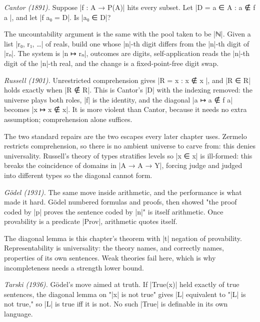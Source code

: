 \documentclass{memoir}
\begin{document}
\emph{Cantor (1891).} Suppose \LeanVerb|f : A → P(A)| hits every subset. Let \LeanVerb|D =  a ∈ A : a ∉ f a |,
and let \LeanVerb|f a₀ = D|. Is \LeanVerb|a₀ ∈ D|?

The uncountability argument is the same with the pool taken to be \LeanVerb|ℕ|. Given a
list \LeanVerb|r₀, r₁, …| of reals, build one whose \LeanVerb|n|-th digit differs from the \LeanVerb|n|-th
digit of \LeanVerb|rₙ|. The system is \LeanVerb|n ↦ rₙ|, outcomes are digits, self-application
reads the \LeanVerb|n|-th digit of the \LeanVerb|n|-th real, and the change is a fixed-point-free
digit swap.

\emph{Russell (1901).} Unrestricted comprehension gives \LeanVerb|R =  x : x ∉ x |, and \LeanVerb|R ∈ R|
holds exactly when \LeanVerb|R ∉ R|. This is Cantor's \LeanVerb|D| with the indexing removed: the
universe plays both roles, \LeanVerb|f| is the identity, and the diagonal \LeanVerb|a ↦ a ∉ f a|
becomes \LeanVerb|x ↦ x ∉ x|. It is more violent than Cantor, because it needs no extra
assumption; comprehension alone suffices.

The two standard repairs are the two escapes every later chapter uses. Zermelo
restricts comprehension, so there is no ambient universe to carve from: this
denies universality. Russell's theory of types stratifies levels so \LeanVerb|x ∈ x| is
ill-formed: this breaks the coincidence of domains in \LeanVerb|A → A → Y|, forcing judge
and judged into different types so the diagonal cannot form.

\emph{Gödel (1931).} The same move inside arithmetic, and the performance is what
made it hard. Gödel numbered formulas and proofs, then showed "the proof coded
by \LeanVerb|p| proves the sentence coded by \LeanVerb|n|" is itself arithmetic. Once provability
is a predicate \LeanVerb|Prov|, arithmetic quotes itself.

The diagonal lemma is this chapter's theorem with \LeanVerb|t| negation of provability.
Representability is universality: the theory names, and correctly names,
properties of its own sentences. Weak theories fail here, which is why
incompleteness needs a strength lower bound.

\emph{Tarski (1936).} Gödel's move aimed at truth. If \LeanVerb|True(x)| held exactly of true
sentences, the diagonal lemma on "\LeanVerb|x| is not true" gives \LeanVerb|L| equivalent to "\LeanVerb|L|
is not true," so \LeanVerb|L| is true iff it is not. No such \LeanVerb|True| is definable in its
own language.
\end{document}
